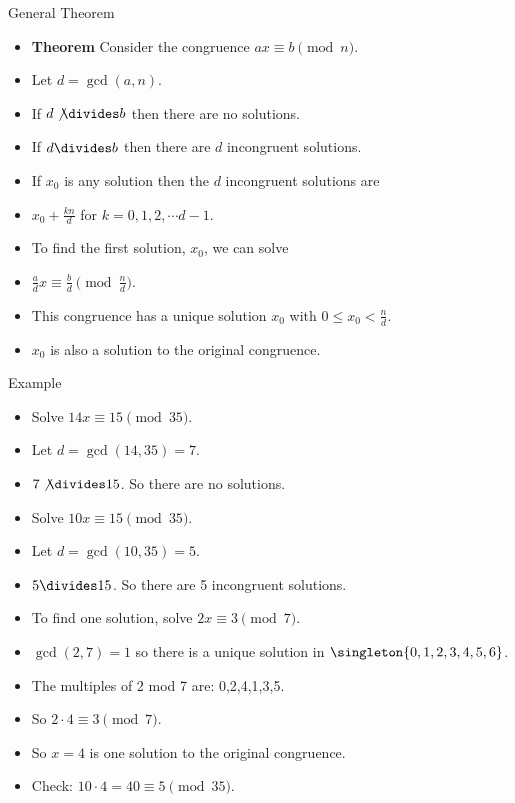 \documentclass{beamer}
\begin{document}
\begin{frame}{General Theorem}
\begin{itemize}
  \item \textbf{Theorem} Consider the congruence $ax\equiv b \pmod n$.
  \item Let $d=\gcd(a,n)$.
  \item If $d\not\divides b$ then there are no solutions.
  \item If $d\divides b$ then there are $d$ incongruent solutions.
  \item If $x_0$ is any solution then the $d$ incongruent solutions are
  \item $x_0 + \frac{kn}{d}$ for $k=0,1,2,\cdots d-1$.
  \item To find the first solution, $x_0$,  we can solve
  \item $\frac{a}{d}x \equiv \frac{b}{d} \pmod {\frac{n}{d}}$.
  \item This congruence has a unique solution $x_0$ with $0\leq x_0 < \frac{n}{d}$.
  \item $x_0$ is also a solution to the original congruence.
\end{itemize}
\end{frame}

\begin{frame}{Example}
\begin{itemize}
  \item Solve $14x \equiv 15 \pmod {35}$.
  \item Let $d=\gcd(14,35) = 7$.
  \item $7\not\divides 15$. So there are no solutions.
  \item Solve $10x \equiv 15 \pmod {35}$.
  \item Let $d=\gcd(10,35) = 5$.
  \item $5\divides 15$. So there are 5 incongruent solutions.
  \item To find one solution, solve $2x \equiv 3 \pmod 7$.
  \item $\gcd(2,7) = 1$ so there is a unique solution in $\singleton{0,1,2,3,4,5,6}$.
  \item The multiples of 2 mod 7 are: 0,2,4,1,3,5.
  \item So $2\cdot 4 \equiv 3 \pmod 7$.
  \item So $x=4$ is one solution to the original congruence.
  \item Check: $10\cdot 4 = 40 \equiv 5 \pmod {35}$.
\end{itemize}
\end{frame}
\end{document}
